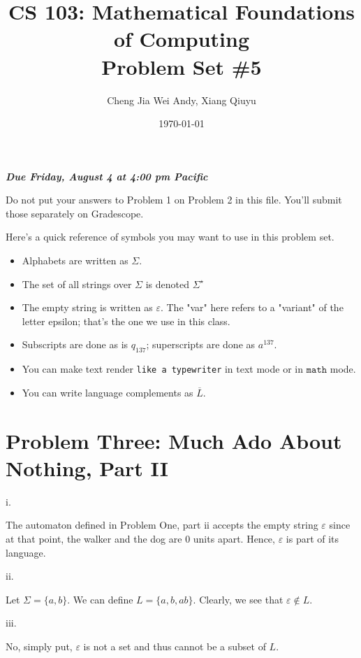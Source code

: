 \documentclass{article}
\title{CS 103: Mathematical Foundations of Computing\\Problem Set \#5}
\author{Cheng Jia Wei Andy, Xiang Qiuyu}
\date{\today}
\renewcommand{\(}{\left(}
\renewcommand{\)}{\right)}
\renewcommand{\emph}[1]{\textit{\textbf{#1}}}
\theoremstyle{plain}
\theoremstyle{plain}
\theoremstyle{definition}
\begin{document}
\maketitle

\begin{center}
  \emph{Due Friday, August 4 at 4:00 pm Pacific}
\end{center}

Do not put your answers to Problem 1 on Problem 2 in this file. You'll submit those separately on Gradescope.

Here's a quick reference of symbols you may want to use in this problem set.

\begin{itemize}
    \item Alphabets are written as $\Sigma$.
    \item The set of all strings over $\Sigma$ is denoted $\Sigma^\star$
    \item The empty string is written as $\varepsilon$. The "var" here refers to a "variant" of the letter epsilon; that's the one we use in this class.
    \item Subscripts are done as is $q_{137}$; superscripts are done as $a^{137}$.
    \item You can make text render \texttt{like a typewriter} in text mode or in $\mathtt{math}$ mode.
    \item You can write language complements as $\overline{L}$.
\end{itemize}

\pagebreak

\section*{Problem Three: Much Ado About Nothing, Part II}
    i.
    \begin{shaded}
        The automaton defined in Problem One, part ii accepts the empty string $\varepsilon$ since at that point, the walker and the dog are 0 units apart. Hence, $\varepsilon$ is part of its language.
    \end{shaded}
    
    ii.
    \begin{shaded}
        Let $\Sigma = \{a, b\}$. We can define $L=\{a, b, ab\}$. Clearly, we see that $\varepsilon\notin L$.
    \end{shaded}
    
    iii.
    \begin{shaded}
        No, simply put, $\varepsilon$ is not a set and thus cannot be a subset of $L$.
    \end{shaded}
    
\end{document}
